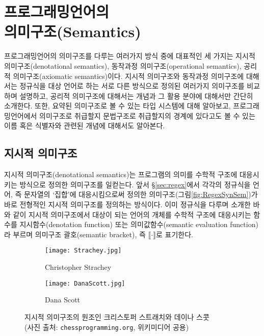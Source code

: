 \chapter[프로그래밍언어의 의미구조(Semantics)]{프로그래밍언어의\\의미구조(Semantics)}

프로그래밍언어의 의미구조를 다루는 여러가지 방식 중에 대표적인
세 가지는 지시적 의미구조(denotational semantics),
동작과정 의미구조(operational semantics),
공리적 의미구조(axiomatic semantics)이다.
지시적 의미구조와 동작과정 의미구조에 대해서는 정규식을 대상 언어로 하는
서로 다른 방식으로 정의된 여러가지 의미구조를 비교하며 설명하고,
공리적 의미구조에 대해서는 개념과 그 활용 분야에 대해서만 간단히 소개한다.
또한, 요약된 의미구조로 볼 수 있는 타입 시스템에 대해 알아보고,
프로그래밍언어에서 의미구조로 취급할지 문법구조로 취급할지의 경계에
있다고도 볼 수 있는 이름 혹은 식별자와 관련된 개념에 대해서도 알아본다.

\newpage

\section{지시적 의미구조}
지시적 의미구조(denotational semantics)는 프로그램의 의미를 수학적 구조에
대응시키는 방식으로 정의한 의미구조를 일컫는다. 앞서 \S\ref{sec:regex}에서
각각의 정규식을 언어, 즉 문자열의 `집합'에 대응시킴으로써 정의한 
의미구조(그림\;\ref{fig:RegexSynSem})가 바로 전형적인 지시적 의미구조를
정의하는 방식이다. 이미 정규식을 다루며 소개한 바와 같이 지시적 의미구조에서
대상이 되는 언어의 개체를 수학적 구조에 대응시키는 함수를 지시함수(denotation function)
또는 의미값함수(semantic evaluation function)라 부르며 의미구조 괄호(semantic bracket),
즉 $\llbracket\cdot\rrbracket$로 표기한다.

\begin{figure}\centering
\begin{subfigure}{.3\textwidth}\centering\vspace*{-2ex}
\texttt{[image: Strachey.jpg]}
\caption{Christopher Strachey}
\end{subfigure}
\qquad\qquad
\begin{subfigure}{.3\textwidth}\centering\vspace*{-2ex}
\texttt{[image: DanaScott.jpg]}
\caption{Dana Scott}
\end{subfigure}
\caption{지시적 의미구조의 원조인
         크리스토퍼 스트래치와 데이나 스콧 \\
         {\footnotesize(사진 출처:
              \texttt{chessprogramming.org}, 위키미디어 공용)}
	 \label{fig:StracheyScott} }
\end{figure}

